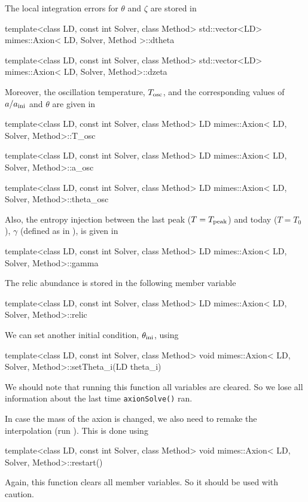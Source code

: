\documentclass[11pt,a4paper]{article}
\begin{document}
The local integration errors for $\theta$ and $\zeta$ are stored in
%
\begin{cpp}
	template<class LD, const int Solver, class Method> 
	std::vector<LD> mimes::Axion< LD, Solver, Method >::dtheta
	
	template<class LD, const int Solver, class Method> 
	std::vector<LD> mimes::Axion< LD, Solver, Method>::dzeta
\end{cpp}
%
Moreover, the oscillation temperature, $T_{\rm osc}{}$, and the corresponding values of $a/a_{\rm ini}{}$ and $\theta$ are given in
%
\begin{cpp}
	template<class LD, const int Solver, class Method>
	LD mimes::Axion< LD, Solver, Method>::T_osc
	
	template<class LD, const int Solver, class Method>
	LD mimes::Axion< LD, Solver, Method>::a_osc

	template<class LD, const int Solver, class Method>
	LD mimes::Axion< LD, Solver, Method>::theta_osc
\end{cpp}
%
Also, the entropy injection between the last peak ($T=T_{\rm peak}$) and today ($T=T_0$), $\gamma$ (defined as in ), is given in 
%
\begin{cpp}
	template<class LD, const int Solver, class Method>
	LD mimes::Axion< LD, Solver, Method>::gamma
\end{cpp}
%
The relic abundance is stored in the following member variable 
%
\begin{cpp}
	template<class LD, const int Solver, class Method>
	LD mimes::Axion< LD, Solver, Method>::relic
\end{cpp}



We can set another initial condition, $\theta_{\rm ini}{}$, using 
%
\begin{cpp}
	template<class LD, const int Solver, class Method>
	void mimes::Axion< LD, Solver, Method>::setTheta_i(LD theta_i)
\end{cpp}
%
We should note that running this function all variables are cleared. So we lose all information about the last time {\tt axionSolve()} ran. 

In case the mass of the axion is changed, we also need to remake  the interpolation (\ie run ). This is done using
%
\begin{cpp}
	template<class LD, const int Solver, class Method>
	void mimes::Axion< LD, Solver, Method>::restart()
\end{cpp}
%
Again, this function clears all member variables. So it should be used with caution.
\end{document}
